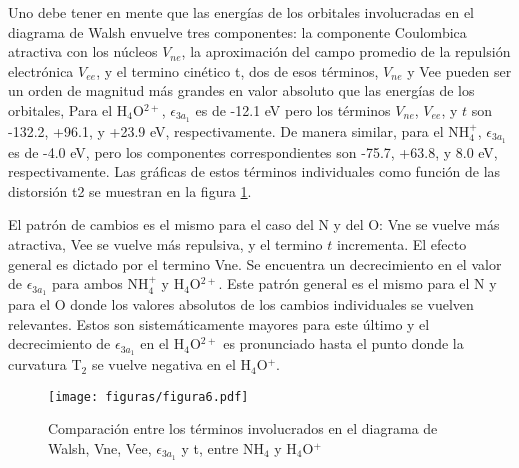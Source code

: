 \documentclass[12pt]{report}
\begin{document}
Uno debe tener en mente que las energías de los orbitales involucradas en el diagrama de Walsh envuelve tres componentes: la componente Coulombica atractiva con los núcleos $V_{ne}$, la aproximación del campo promedio de la repulsión electrónica $V_{ee}$, y el termino cinético t, dos de esos términos, $V_{ne}$ y Vee pueden ser un orden de
 magnitud más grandes en valor absoluto que las energías de los orbitales, Para el H$_4$O$^{2+}$, $\epsilon_{3a_1}$ es de -12.1 eV pero los términos $V_{ne}$, $V_{ee}$, y $t$ son       -132.2, +96.1, y +23.9 eV, respectivamente. De manera similar, para el NH$_4^+$, $\epsilon_{3a_1}$ es de -4.0 eV, pero los componentes correspondientes son -75.7, +63.8, y 8.0 eV,
 respectivamente. Las gráficas de estos términos individuales como función de las distorsión t2 se muestran en la figura \ref{walsh2}.

\newpage 
 
El patrón de cambios es el mismo para el caso del N y del O: Vne se vuelve más atractiva, Vee se vuelve más repulsiva, y el termino $t$ incrementa. El efecto general es dictado por el termino Vne. Se encuentra un decrecimiento en el valor de $\epsilon_{3a_1}$ para ambos NH$_4^+$ y H$_4$O$^{2+}$. Este patrón general es el mismo para el N y para el O donde los valores absolutos de los cambios individuales se vuelven relevantes. Estos son sistemáticamente mayores para este último y el decrecimiento de $\epsilon_{3a_1}$ en el H$_4$O$^{2+}$ es pronunciado hasta el punto donde la curvatura T$_2$ se vuelve negativa en el H$_4$O$^+$.

\begin{figure}[h!]
\centering
\texttt{[image: figuras/figura6.pdf]} 
\caption{Comparación entre los términos involucrados en el diagrama de Walsh, Vne, Vee, $\epsilon_{3a_1}$ y t, entre NH$_4$ y H$_4$O$^+$}
\label{walsh2}
\end{figure}
\end{document}

